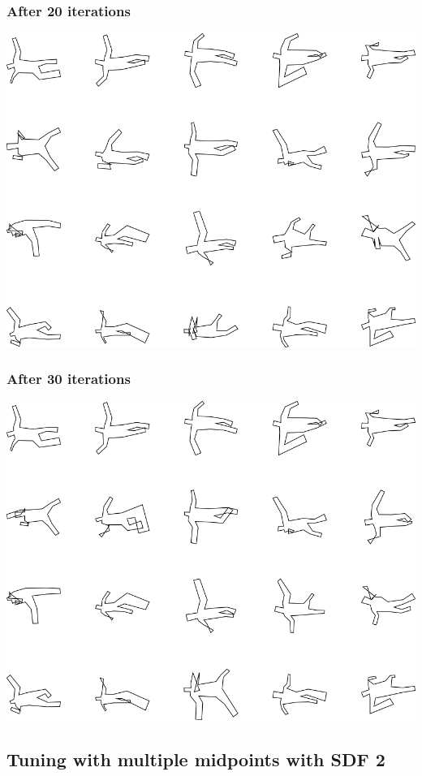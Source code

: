 \subsubsection{After 20 iterations}

\includegraphics[width=6in]{output/3.learning/multi_tuning/multi_tuning_iter20_.png}
\subsubsection{After 30 iterations}

\includegraphics[width=6in]{output/3.learning/multi_tuning/multi_tuning_iter30_.png}
\subsection{Tuning with multiple midpoints with SDF 2}

